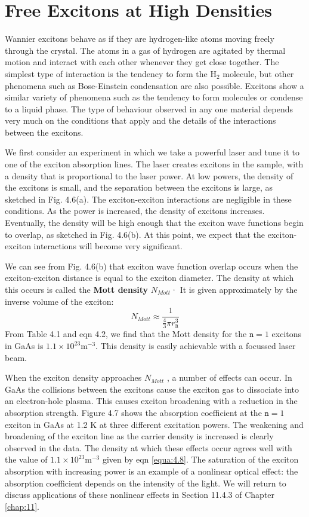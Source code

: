 \documentclass[12pt]{book}
\begin{document}
\section{Free Excitons at High Densities}
Wannier excitons behave as if they are hydrogen-like atoms moving freely through the crystal. The atoms in a gas of hydrogen are agitated by thermal motion and interact with each other whenever they get close together. The simplest type of interaction is the tendency to form the $\mathrm{H_2}$ molecule, but other phenomena such as Bose-Einstein condensation are also possible. Excitons show a similar variety of phenomena such as the tendency to form molecules or condense to a liquid phase. The type of behaviour observed in any one material depends very much on the conditions that apply and the details of the interactions between the excitons.

We first consider an experiment in which we take a powerful laser and tune it to one of the exciton absorption lines. The laser creates excitons in the sample, with a density that is proportional to the laser power. At low powers, the density of the excitons is small, and the separation between the excitons is large, as sketched in Fig. 4.6(a). The exciton-exciton interactions are negligible in these conditions. As the power is increased, the density of excitons increases. Eventually, the density will be high enough that the exciton wave functions begin to overlap, as sketched in Fig. 4.6(b). At this point, we expect that the exciton-exciton interactions will become very significant.

We can see from Fig. 4.6(b) that exciton wave function overlap occurs when the exciton-exciton distance is equal to the exciton diameter. The density at which this occurs is called the \textbf{Mott density} $N_{Mott}$· It is given approximately by the inverse volume of the exciton:
\begin{equation}\label{equa:4.8}
  N_{Mott}\approx\frac{1}{\frac{4}{3}\pi r_{\texttt{n}}^3}
\end{equation}
From Table 4.1 and eqn 4.2, we find that the Mott density for the $\texttt{n} = 1$ excitons in GaAs is $1.1\times10^{23} \mathrm{m^{-3}}$. This density is easily achievable with a focussed laser beam.

When the exciton density approaches $N_{Mott}$ , a number of effects can occur. In GaAs the collisions between the excitons cause the exciton gas to dissociate into an electron-hole plasma. This causes exciton broadening with a reduction in the absorption strength. Figure 4.7 shows the absorption coefficient at the $\texttt{n} = 1$ exciton in GaAs at 1.2 K at three different excitation powers. The weakening and broadening of the exciton line as the carrier density is increased is clearly observed in the data. The density at which these effects occur agrees well with the value of $1.1\times 10^{23} \mathrm{m^{-3}}$ given by eqn \ref{equa:4.8}. The saturation of the exciton absorption with increasing power is an example of a nonlinear optical effect: the absorption coefficient depends on the intensity of the light. We will return to discuss applications of these nonlinear effects in Section 11.4.3 of Chapter \ref{chap:11}.
\end{document}
